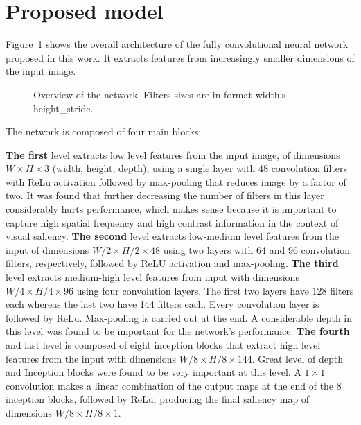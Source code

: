 \documentclass[12pt]{article}
\begin{document}
\section{Proposed model}
Figure~\ref{fig:model} shows the overall architecture of the fully
convolutional neural network proposed in this work.
It extracts features from increasingly smaller dimensions of the
input image.

\begin{figure}[hbt]
    \centering
    \def\svgwidth{0.9\columnwidth}
    
    \label{fig:model}
    \caption{Overview of the network.
        Filters sizes are in format width$\times$height\_stride.}
\end{figure}

The network is composed of four main blocks:

\textbf{The first} level extracts low level features from the input image, of
        dimensions $W\times H \times 3$ (width, height, depth), using
        a single layer with 48 convolution filters with ReLu activation
        followed by max-pooling that reduces image by a factor of two.
        It was found that further decreasing the number of filters in this
        layer considerably hurts performance, which makes sense because it is
        important to capture high spatial frequency and high contrast
        information in the context of visual saliency.
\textbf{The second} level extracts low-medium level features from the
        input of dimensions $W/2 \times H/2 \times 48$ using two layers
        with 64 and 96 convolution filters, respectively, followed by ReLU
        activation and max-pooling.
		\textbf{The third }level extracts medium-high level features from input with
        dimensions $W/4 \times H/4 \times 96$ using four convolution layers.
        The first two layers have 128 filters each whereas the last two have 144 filters
        each. Every convolution layer is followed by ReLu.
        Max-pooling is carried out at the end.
        A considerable depth in this level was found to be important for
        the network's performance.
\textbf{The fourth} and last level is composed of eight inception blocks
        that extract high level features from the input with
        dimensions $W/8 \times H/8 \times 144$.
        Great level of depth and Inception blocks were found to be very
        important at this level.
        A $1 \times 1$ convolution makes a linear combination of the output
        maps at the end of the 8 inception blocks, followed by ReLu, producing
        the final saliency map of dimensions $W/8 \times H/8 \times 1$.
\end{document}
